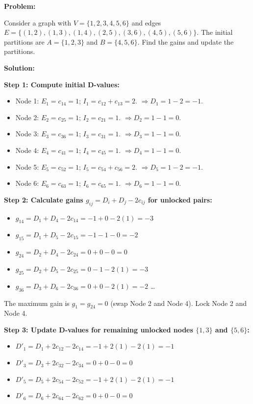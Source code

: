 \documentclass[12pt,a4paper]{article}
\newcommand{\Q}[1]{\textbf{#1}\par\noindent\ignorespaces}
\begin{document}
\begin{tcolorbox}[examplebox, title={Kernighan-Lin Step-by-Step Example}]
\Q{Problem:} Consider a graph with $V = \{1, 2, 3, 4, 5, 6\}$ and edges $E = \{(1,2), (1,3), (1,4), (2,5), (3,6), (4,5), (5,6)\}$. The initial partitions are $A = \{1, 2, 3\}$ and $B = \{4, 5, 6\}$. Find the gains and update the partitions.

\textbf{Solution:}\par\noindent
\textbf{Step 1: Compute initial D-values:}
\begin{itemize}[leftmargin=*, itemsep=1pt]
  \item Node 1: $E_1 = c_{14} = 1$; $I_1 = c_{12} + c_{13} = 2$. $\Rightarrow D_1 = 1 - 2 = -1$.
  \item Node 2: $E_2 = c_{25} = 1$; $I_2 = c_{21} = 1$. $\Rightarrow D_2 = 1 - 1 = 0$.
  \item Node 3: $E_3 = c_{36} = 1$; $I_3 = c_{31} = 1$. $\Rightarrow D_3 = 1 - 1 = 0$.
  \item Node 4: $E_4 = c_{41} = 1$; $I_4 = c_{45} = 1$. $\Rightarrow D_4 = 1 - 1 = 0$.
  \item Node 5: $E_5 = c_{52} = 1$; $I_5 = c_{54} + c_{56} = 2$. $\Rightarrow D_5 = 1 - 2 = -1$.
  \item Node 6: $E_6 = c_{63} = 1$; $I_6 = c_{65} = 1$. $\Rightarrow D_6 = 1 - 1 = 0$.
\end{itemize}

\textbf{Step 2: Calculate gains $g_{ij} = D_i + D_j - 2c_{ij}$ for unlocked pairs:}
\begin{itemize}[leftmargin=*, itemsep=1pt]
  \item $g_{14} = D_1 + D_4 - 2c_{14} = -1 + 0 - 2(1) = -3$
  \item $g_{15} = D_1 + D_5 - 2c_{15} = -1 - 1 - 0 = -2$
  \item $g_{24} = D_2 + D_4 - 2c_{24} = 0 + 0 - 0 = 0$
  \item $g_{25} = D_2 + D_5 - 2c_{25} = 0 - 1 - 2(1) = -3$
  \item $g_{36} = D_3 + D_6 - 2c_{36} = 0 + 0 - 2(1) = -2$
  \dots
\end{itemize}
The maximum gain is $g_1 = g_{24} = 0$ (swap Node 2 and Node 4).
Lock Node 2 and Node 4.

\textbf{Step 3: Update D-values for remaining unlocked nodes $\{1, 3\}$ and $\{5, 6\}$:}
\begin{itemize}[leftmargin=*, itemsep=1pt]
  \item $D'_1 = D_1 + 2c_{12} - 2c_{14} = -1 + 2(1) - 2(1) = -1$
  \item $D'_3 = D_3 + 2c_{32} - 2c_{34} = 0 + 0 - 0 = 0$
  \item $D'_5 = D_5 + 2c_{54} - 2c_{52} = -1 + 2(1) - 2(1) = -1$
  \item $D'_6 = D_6 + 2c_{64} - 2c_{62} = 0 + 0 - 0 = 0$
\end{itemize}


\end{tcolorbox}
\end{document}
